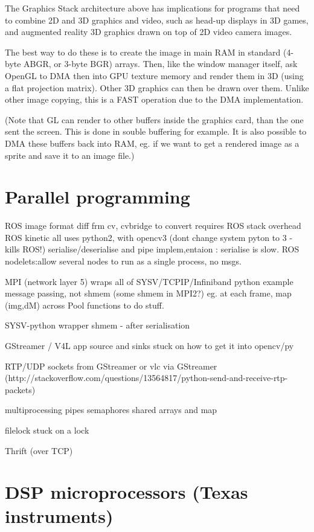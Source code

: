 \documentclass[oneside,english]{scrbook}
\begin{document}
The Graphics Stack architecture above has implications for programs that need to combine 2D and 3D graphics and video, such as head-up displays in 3D games, and augmented reality 3D graphics drawn on top of 2D video camera images.

The best way to do these is to create the image in main RAM in standard (4-byte ABGR, or 3-byte BGR) arrays. Then, like the window manager itself, ask OpenGL to DMA then into GPU texture memory and render them in 3D (using a flat projection matrix). Other 3D graphics can then be drawn over them.  Unlike other image copying, this is a FAST operation due to the DMA implementation.

(Note that GL can render to other buffers inside the graphics card, than the one sent the screen. This is done in souble buffering for example. It is also possible to DMA these buffers back into RAM, eg. if we want to get a rendered image as a sprite and save it to an image file.)

\chapter{Parallel programming}

ROS image format diff frm cv, cvbridge to convert requires ROS stack
overhead ROS kinetic all uses python2, with opencv3 (dont change system
pyton to 3 - kills ROS!) serialise/deserialise and pipe implem,entaion
: serialise is slow. ROS nodelets:allow several nodes to run as a
single process, no msgs.

MPI (network layer 5) wraps all of SYSV/TCPIP/Infiniband python example
message passing, not shmem (some shmem in MPI2?) eg. at each frame,
map (img,dM) across Pool functions to do stuff.

SYSV-python wrapper shmem - after serialisation

GStreamer / V4L app source and sinks stuck on how to get it into opencv/py

RTP/UDP sockets from GStreamer or vlc via GStreamer (http://stackoverflow.com/questions/13564817/python-send-and-receive-rtp-packets)

multiprocessing pipes semaphores shared arrays and map

filelock stuck on a lock

Thrift (over TCP)


\chapter{DSP microprocessors (Texas instruments)}
\end{document}
